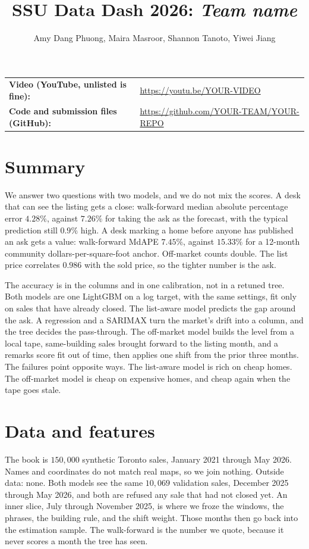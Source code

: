 \documentclass[11pt]{article}
\title{SSU Data Dash 2026: \textit{Team name}}
\author{Amy Dang Phuong, Maira Masroor, Shannon Tanoto, Yiwei Jiang}
\date{}
\begin{document}
\maketitle
\vspace{-10pt}

\noindent\begin{tabular}{@{}l l@{}}
\textbf{Video (YouTube, unlisted is fine):} & \url{https://youtu.be/YOUR-VIDEO} \\
\textbf{Code and submission files (GitHub):} & \url{https://github.com/YOUR-TEAM/YOUR-REPO} \\
\end{tabular}

\section*{Summary}

We answer two questions with two models, and we do not mix the scores. A desk that can see the listing gets a close: walk-forward median absolute percentage error \(4.28\%\), against \(7.26\%\) for taking the ask as the forecast, with the typical prediction still \(0.9\%\) high. A desk marking a home before anyone has published an ask gets a value: walk-forward MdAPE \(7.45\%\), against \(15.33\%\) for a 12-month community dollars-per-square-foot anchor. Off-market counts double. The list price correlates \(0.986\) with the sold price, so the tighter number is the ask.

The accuracy is in the columns and in one calibration, not in a retuned tree. Both models are one LightGBM on a log target, with the same settings, fit only on sales that have already closed. The list-aware model predicts the gap around the ask. A regression and a SARIMAX turn the market's drift into a column, and the tree decides the pass-through. The off-market model builds the level from a local tape, same-building sales brought forward to the listing month, and a remarks score fit out of time, then applies one shift from the prior three months. The failures point opposite ways. The list-aware model is rich on cheap homes. The off-market model is cheap on expensive homes, and cheap again when the tape goes stale.

\section{Data and features}

The book is \(150{,}000\) synthetic Toronto sales, January 2021 through May 2026. Names and coordinates do not match real maps, so we join nothing. Outside data: none. Both models see the same \(10{,}069\) validation sales, December 2025 through May 2026, and both are refused any sale that had not closed yet. An inner slice, July through November 2025, is where we froze the windows, the phrases, the building rule, and the shift weight. Those months then go back into the estimation sample. The walk-forward is the number we quote, because it never scores a month the tree has seen.
\end{document}
